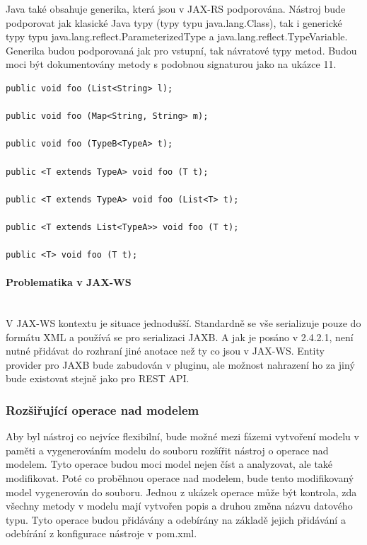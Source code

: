\documentclass[11pt,twoside,a4paper]{book}
\begin{document}
\begin{itemize}
Java také obsahuje generika, která jsou v JAX-RS podporována. Nástroj bude podporovat jak
klasické Java typy (typy typu java.lang.Class), tak i generické typy typu
java.lang.reflect.ParameterizedType a java.lang.reflect.TypeVariable. Generika
budou podporovaná jak pro vstupní, tak návratové typy metod. Budou moci být 
dokumentovány metody s podobnou signaturou jako na ukázce 11.

\begin{lstlisting}[frame=single]
public void foo (List<String> l);

public void foo (Map<String, String> m);

public void foo (TypeB<TypeA> t);

public <T extends TypeA> void foo (T t);

public <T extends TypeA> void foo (List<T> t);

public <T extends List<TypeA>> void foo (T t);

public <T> void foo (T t);
\end{lstlisting}

\paragraph{Problematika v JAX-WS}
\mbox{}\\

V JAX-WS kontextu je situace jednodušší. Standardně se vše serializuje pouze do formátu
XML a používá se pro serializaci JAXB. A jak je posáno v 2.4.2.1, není nutné přidávat do
rozhraní jiné anotace než ty co jsou v JAX-WS. Entity provider pro JAXB bude zabudován v
pluginu, ale možnost nahrazení ho za jiný bude existovat stejně jako pro REST API.

\subsubsection{Rozšiřující operace nad modelem}

Aby byl nástroj co nejvíce flexibilní, bude možné mezi fázemi vytvoření modelu v paměti a
vygenerováním modelu do souboru rozšířit nástroj o operace nad modelem. Tyto operace
budou moci model nejen číst a analyzovat, ale také modifikovat. Poté co proběhnou operace
nad modelem, bude tento modifikovaný model vygenerován do souboru. Jednou z ukázek
operace může být kontrola, zda všechny metody v modelu mají vytvořen popis a druhou
změna názvu datového typu. Tyto operace budou přidávány a odebírány na základě jejich
přidávání a odebírání z konfigurace nástroje v pom.xml.


\end{itemize}
\end{document}
